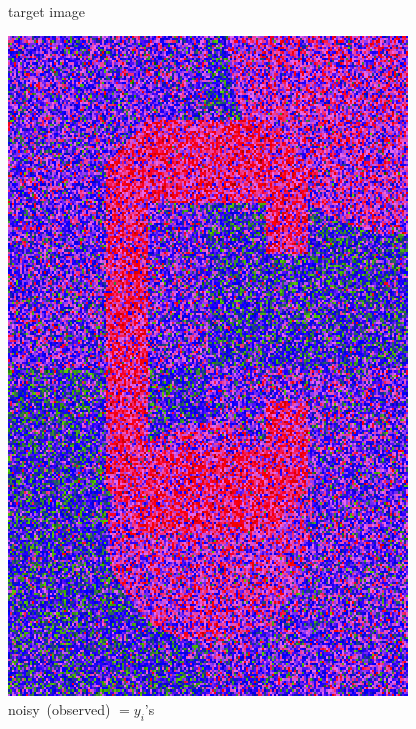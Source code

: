 \documentclass[12pt]{beamer}
\begin{document}
\begin{frame}
\begin{center}
\begin{minipage}[t]{0.2\textwidth}
{\small target image}
\end{minipage}
\hfill
\begin{minipage}[t]{0.2\textwidth}
\includegraphics[width=\textwidth]{c_noisy.png} \\
{\small \mbox{noisy (observed)} $= y_i$'s}
\end{minipage}
\hfill
\begin{minipage}[t]{0.2\textwidth}

\end{minipage}
\end{center}
\end{frame}
\end{document}
